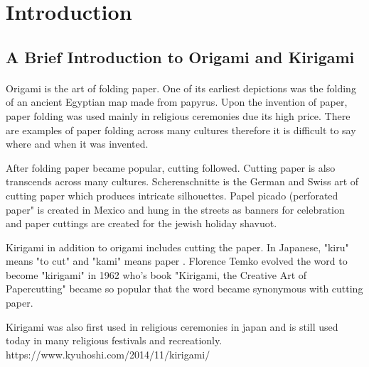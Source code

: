 \documentclass[11pt]{article}
\begin{document}
\newpage
\section{Introduction}

        \subsection{A Brief Introduction to Origami and Kirigami}
        
            \paragraph{}
            Origami is the art of folding paper. One of its earliest depictions was the folding of an ancient Egyptian map made from papyrus. Upon the invention of paper, paper folding was used mainly in religious ceremonies due its high price. There are examples of paper folding across many cultures therefore it is difficult to say where and when it was invented. %
            
            After folding paper became popular, cutting followed. Cutting paper is also transcends across many cultures. Scherenschnitte is the German and Swiss art of cutting paper which produces intricate silhouettes. %
            Papel picado (perforated paper" is created in Mexico and hung in the streets as banners for celebration
            and paper cuttings are created for the jewish holiday shavuot. %
            
            
            Kirigami in addition to origami includes cutting the paper. In Japanese, "kiru" means "to cut"
            \cite{Temko2004kirigami} and "kami" means paper %
            . Florence Temko evolved the word to become "kirigami" in 1962 who's book "Kirigami, the Creative Art of Papercutting" became so popular that the word became synonymous with cutting paper. %
          
          Kirigami was also first used in religious ceremonies in japan and is still used today in many religious festivals and recreationly.
          https://www.kyuhoshi.com/2014/11/kirigami/
           
\end{document}
